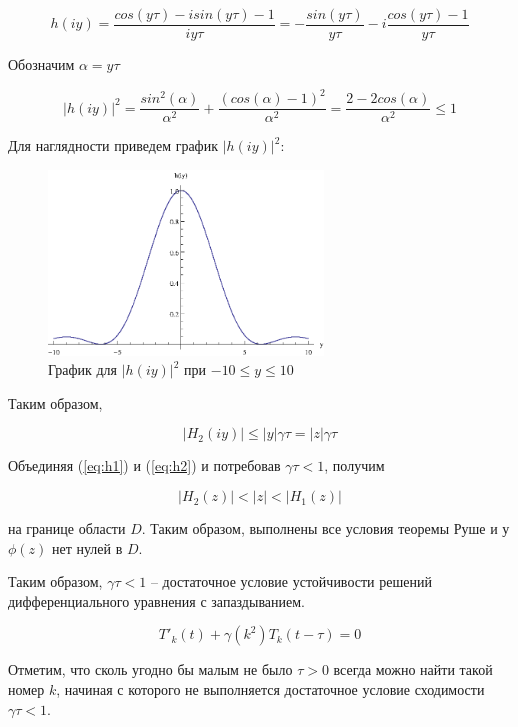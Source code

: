 \begin{equation}
h(iy) = \dfrac{cos(y \tau) - i sin(y \tau) - 1}{iy \tau} = -\dfrac{sin(y \tau)}{y \tau} - i \dfrac{cos(y \tau)-1}{y \tau}
\end{equation}

Обозначим $\alpha = y \tau$

\begin{equation}
{|h(iy)|}^2 = \dfrac{sin^2(\alpha)}{\alpha^2} + \dfrac{(cos(\alpha)-1)^2}{\alpha^2} = \dfrac{2-2cos(\alpha)}{\alpha^2} \leq 1
\end{equation}

Для наглядности приведем график ${|h(iy)|}^2$:

\begin{figure}[h]
\begin{center}
\includegraphics[width=0.65\textwidth]{./2_analysis/proof.eps}
\end{center}
\caption{График для ${|h(iy)|}^2$ при $-10 \leq y \leq 10$}
\end{figure}

Таким образом,

\begin{equation}\label{eq:h2}
|H_2(iy)| \leq |y| \gamma \tau = |z| \gamma \tau
\end{equation}

Объединяя (\ref{eq:h1}) и (\ref{eq:h2}) и потребовав $\gamma \tau < 1$, получим

\begin{equation}
|H_2(z)| < |z| < |H_1(z)|
\end{equation}

на границе области $D$. Таким образом, выполнены все условия теоремы Руше и у $\phi(z)$ нет нулей в $D$.

Таким образом, $\gamma \tau < 1$ \--- достаточное условие устойчивости решений дифференциального уравнения с запаздыванием.

\begin{equation}
{T'}_{k}(t) + \gamma(k^2) T_k (t-\tau)=0
\end{equation}

Отметим, что сколь угодно бы малым не было $\tau>0$ всегда можно найти такой номер $k$, начиная с которого не выполняется достаточное условие сходимости $\gamma \tau < 1$.